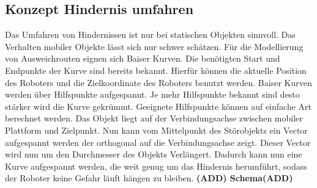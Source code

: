 \subsection{Konzept Hindernis umfahren}
Das Umfahren von Hindernissen ist nur bei statischen Objekten sinnvoll. Das Verhalten mobiler Objekte lässt sich nur schwer schätzen. Für die Modellierung von Ausweichrouten eignen sich Baiser Kurven. Die benötigten Start und Endpunkte der Kurve sind bereits bekannt. Hierfür können die aktuelle Position des Roboters und die Zielkoordinate des Roboters benutzt werden. Baiser Kurven werden über Hilfspunkte aufgespannt. Je mehr Hilfspunkte bekannt sind desto stärker wird die Kurve gekrümmt. Geeignete Hilfspunkte können auf einfache Art berechnet werden. Das Objekt liegt auf der Verbindungsachse zwischen mobiler Plattform und Zielpunkt. Nun kann vom Mittelpunkt des Störobjekts ein Vector aufgespannt werden der orthogonal auf die Verbindungsachse zeigt. Dieser Vector wird nun um den Durchmesser des Objekts Verlängert. Dadurch kann nun eine Kurve aufgespannt werden, die weit genug um das Hindernis herumführt, sodass der Roboter keine Gefahr läuft hängen zu bleiben.
\textbf{(ADD) Schema(ADD)}